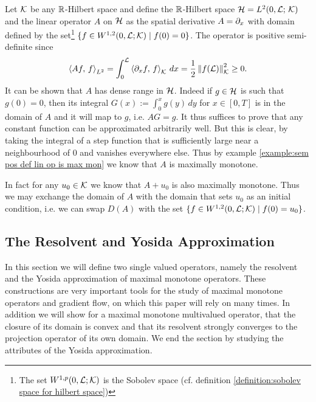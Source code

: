 \begin{example}\label{example:spat der of W is max mon}
	Let $ \mathcal{K} $ be any $ \mathbb{R} $-Hilbert space and define 
	the $ \mathbb{R} $-Hilbert space $ \mathcal{H}=L^2(0,\mathcal{L};\,\mathcal{K}) $ 
	and the linear operator $ A $ on $ \mathcal{H} $ as the spatial 
	derivative $ A=\partial_x $ with domain
	defined by the set\footnote{The set $ W^{1,p}(0,\mathcal{L}; \mathcal{K}) $
		is the Sobolev space 
		(cf. definition \ref{definition:sobolev space for hilbert space})}
	$ \{f\in W^{1,2}(0,\mathcal{L}; \mathcal{K})\;\vert\; f(0)=0\} $. 
	The operator is positive semi-definite since
	\begin{align*}
		\left\langle Af,\,f\right\rangle_{L^2}
		=\int_0^{\mathcal{L}}\left\langle \partial_x f,\,f\right\rangle_{\mathcal{K}}\,dx
		=\frac{1}{2}\left\Vert f(\mathcal{L})\right\Vert_{\mathcal{K}}^2
		\geq 0.
	\end{align*}
	It can be shown that $ A $ has dense range in $ \mathcal{H} $.
	Indeed if $ g\in\mathcal{H} $ is such that $ g(0)=0 $,
	then its integral $ G(x):=\int_0^x g(y)\,dy $
	for $ x\in[0,T] $ is in the domain of $ A $
	and it will map to $ g $, i.e. $ AG=g $.
	It thus suffices to prove that any constant function
	can be approximated arbitrarily well. But this is clear, by
	taking the integral of a step function that is sufficiently 
	large near a neighbourhood of $ 0 $ and vanishes everywhere else.
	Thus by example \ref{example:sem pos def lin op is max mon}
	we know that $ A $ is maximally monotone.\smallskip
	
	In fact for any $ u_0\in \mathcal{K} $ we know that $ A+u_0 $ is
	also maximally monotone. Thus we may exchange the domain of
	$ A $ with the domain that sets $ u_0 $ as an initial 
	condition, i.e. we can swap $ D(A) $
	with the set $\{f\in W^{1,2}(0,\mathcal{L};\mathcal{K})\;\vert\; f(0)=u_0\} $.
\end{example}

\subsection{The Resolvent and Yosida Approximation}

In this section we will define two single valued operators, namely
the resolvent and the Yosida approximation of maximal monotone operators.
These constructions are very important tools for the
study of maximal monotone operators and gradient flow, on
which this paper will rely on many times. In addition we will
show for a maximal monotone multivalued operator,
that the closure of its domain is convex and that its
resolvent strongly converges to the projection operator of its own domain.
We end the section by studying the attributes of 
the Yosida approximation.\smallskip

